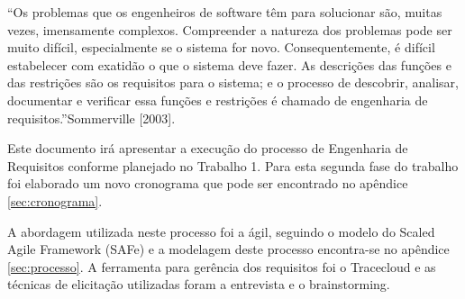 “Os problemas que os engenheiros de software têm para solucionar são, muitas vezes, imensamente complexos. Compreender a natureza dos problemas pode ser muito difícil, especialmente se o sistema for novo. Consequentemente, é difícil estabelecer com exatidão o que o sistema deve fazer. As descrições das funções e das restrições são os requisitos para o sistema; e o processo de descobrir, analisar, documentar e verificar essa funções e restrições é chamado de engenharia de requisitos.”Sommerville [2003].

Este documento irá apresentar a execução do processo de Engenharia de Requisitos conforme planejado no Trabalho 1. Para esta segunda fase  do trabalho foi elaborado um novo cronograma que pode ser encontrado no apêndice \ref{sec:cronograma}.

A abordagem utilizada neste processo foi a ágil,  seguindo o modelo do Scaled Agile Framework (SAFe) e a modelagem deste processo encontra-se no apêndice \ref{sec:processo}. A ferramenta para gerência dos requisitos foi o Tracecloud e as técnicas de elicitação utilizadas foram a entrevista e  o brainstorming.
